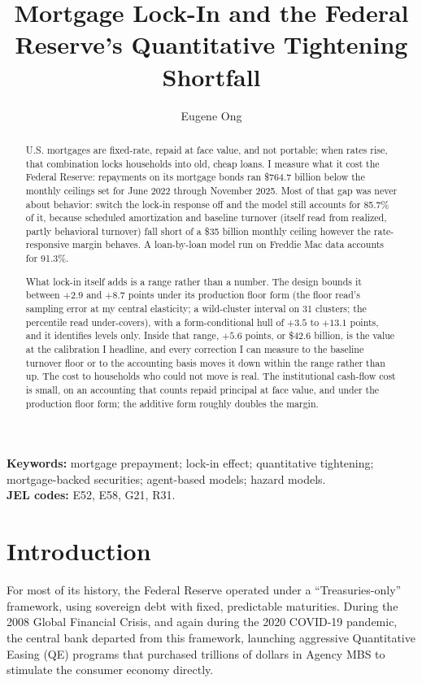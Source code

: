 \documentclass[12pt]{article}
\title{Mortgage Lock-In and the Federal Reserve's Quantitative Tightening Shortfall}
\author{Eugene Ong}
\affil{Carnegie Mellon University}
\date{}
\begin{document}
\maketitle
\begin{abstract}
\noindent U.S. mortgages are fixed-rate, repaid at face value, and not portable; when rates rise, that combination locks households into old, cheap loans. I measure what it cost the Federal Reserve: repayments on its mortgage bonds ran \$764.7 billion below the monthly ceilings set for June 2022 through November 2025. Most of that gap was never about behavior: switch the lock-in response off and the model still accounts for 85.7\% of it, because scheduled amortization and baseline turnover (itself read from realized, partly behavioral turnover) fall short of a \$35 billion monthly ceiling however the rate-responsive margin behaves. A loan-by-loan model run on Freddie Mac data accounts for 91.3\%. \par What lock-in itself adds is a range rather than a number. The design bounds it between $+2.9$ and $+8.7$ points under its production floor form (the floor read's sampling error at my central elasticity; a wild-cluster interval on 31 clusters; the percentile read under-covers), with a form-conditional hull of $+3.5$ to $+13.1$ points, and it identifies levels only. Inside that range, $+5.6$ points, or \$42.6 billion, is the value at the calibration I headline, and every correction I can measure to the baseline turnover floor or to the accounting basis moves it down within the range rather than up. The cost to households who could not move is real. The institutional cash-flow cost is small, on an accounting that counts repaid principal at face value, and under the production floor form; the additive form roughly doubles the margin.
\end{abstract}

\vspace{0.5\baselineskip}
{\footnotesize\noindent\textbf{Keywords:} mortgage prepayment; lock-in effect; quantitative tightening; mortgage-backed securities; agent-based models; hazard models.\\
\textbf{JEL codes:} E52, E58, G21, R31.\par}
\newpage
\section{Introduction}\label{sec:intro}

For most of its history, the Federal Reserve operated under a ``Treasuries-only'' framework, using sovereign debt with fixed, predictable maturities. During the 2008 Global Financial Crisis, and again during the 2020 COVID-19 pandemic, the central bank departed from this framework, launching aggressive Quantitative Easing (QE) programs that purchased trillions of dollars in Agency MBS to stimulate the consumer economy directly.
\end{document}
